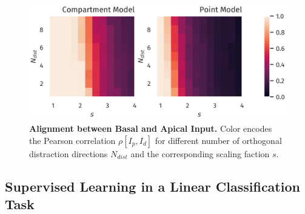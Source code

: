 \documentclass[10pt,a4paper,twocolumn]{article}
\begin{document}
		\begin{figure}
			\includegraphics[width=\columnwidth]{corr_dimension_scaling}
			\caption{{\bf Alignment between Basal and Apical Input.} Color
			encodes the Pearson correlation $\rho[I_p,I_d]$ for different
			number of orthogonal distraction directions $N_{dist}$ 
			and the corresponding scaling faction $s$.}
			\label{fig:corr_dimension_scaling}
		\end{figure}
		
		\subsection{Supervised Learning in a Linear Classification Task}
		\label{sect:classification}
		
\end{document}
